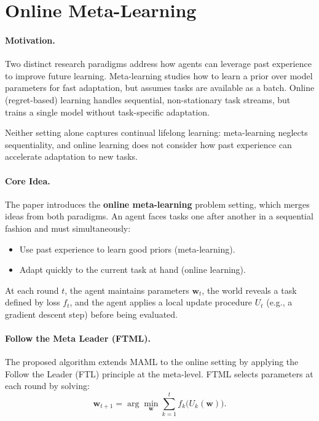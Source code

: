 \documentclass[12pt]{article}
\begin{document}
\psetheader %

\section*{Online Meta-Learning}

\paragraph{Motivation.}
Two distinct research paradigms address how agents can leverage past experience
to improve future learning. Meta-learning studies how to learn a prior over model
parameters for fast adaptation, but assumes tasks are available as a batch.
Online (regret-based) learning handles sequential, non-stationary task streams,
but trains a single model without task-specific adaptation.

Neither setting alone captures continual lifelong learning: meta-learning neglects
sequentiality, and online learning does not consider how past experience can
accelerate adaptation to new tasks.

\paragraph{Core Idea.}
The paper introduces the \textbf{online meta-learning} problem setting, which
merges ideas from both paradigms. An agent faces tasks one after another in a
sequential fashion and must simultaneously:

\begin{itemize}
		\item Use past experience to learn good priors (meta-learning).
		\item Adapt quickly to the current task at hand (online learning).
\end{itemize}

At each round $t$, the agent maintains parameters $\mathbf{w}_t$, the world
reveals a task defined by loss $f_t$, and the agent applies a local update
procedure $U_t$ (e.g., a gradient descent step) before being evaluated.

\paragraph{Follow the Meta Leader (FTML).}
The proposed algorithm extends MAML to the online setting by applying the
Follow the Leader (FTL) principle at the meta-level. FTML selects parameters
at each round by solving:
\[
		\mathbf{w}_{t+1} = \arg\min_{\mathbf{w}} \sum_{k=1}^{t} f_k\bigl(U_k(\mathbf{w})\bigr).
\]
\end{document}
